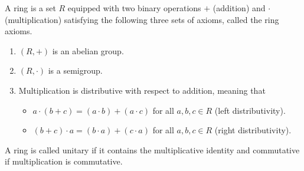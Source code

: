 \begin{defn}[Ring]
    A ring is a set \(R\) equipped with two binary operations \(+\) (addition) and \(\cdot\) (multiplication) satisfying the following three sets of axioms, called the ring axioms.
    \begin{enumerate}
      \item \((R, +)\) is an abelian group.
      \item \((R, \cdot)\) is a semigroup.
      \item Multiplication is distributive with respect to addition, meaning that
      \begin{itemize}
        \item \(a \cdot (b + c) = (a \cdot b) + (a \cdot c)\) for all \(a, b, c \in R\) (left distributivity).
        \item \((b + c) \cdot a = (b \cdot a) + (c \cdot a)\) for all \(a, b, c \in R\) (right distributivity).
      \end{itemize}
    \end{enumerate}
    A ring is called unitary if it contains the multiplicative identity and commutative if multiplication is commutative.
\end{defn}

\begin{defn}[Ideal]
    
\end{defn}

\begin{defn}
    
\end{defn}

\begin{defn}
    
\end{defn}

\begin{defn}
    
\end{defn}

